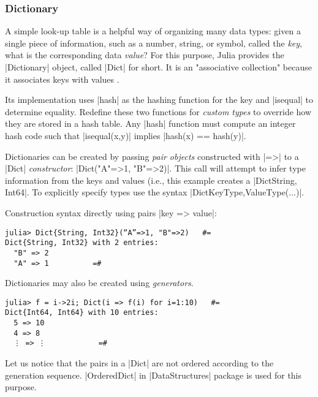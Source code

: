 \subsubsection*{Dictionary}

A simple look-up table is a helpful way of organizing many data types: given a single piece of information, such as a number, string, or symbol, called the \emph{key}, what is the corresponding data \emph{value}? For this purpose, Julia provides the |Dictionary| object, called |Dict| for short. It is an "associative collection" because it associates keys with values \cite{wiki:dict:sets}.

\begin{definition} 
Its implementation uses |hash| as the hashing function for the key and |isequal| to determine equality. Redefine these two functions for \emph{custom types} to override how they are stored in a hash table. Any |hash| function must compute an integer hash code such that |isequal(x,y)| implies |hash(x) == hash(y)|. 
\end{definition}

Dictionaries can be created by passing \emph{pair objects} constructed with |=>| to a |Dict| \emph{constructor}: |Dict("A"=>1, "B"=>2)|. This call will attempt to infer type information from the keys and values (i.e., this example creates a |Dict{String, Int64}|. To explicitly specify types use the syntax |Dict{KeyType,ValueType}(...)|.

\begin{coding} Construction syntax directly using pairs |key => value|:
\begin{lstlisting}[language=JuliaLocal, style=julia, mathescape=false]
julia> Dict{String, Int32}(“A”=>1, "B"=>2)   #=
Dict{String, Int32} with 2 entries:
  "B" => 2
  "A" => 1 			=#
\end{lstlisting}
\end{coding}

\begin{coding} 
Dictionaries may also be created using \emph{generators}.
\begin{lstlisting}[language=JuliaLocal, style=julia, mathescape=false]
julia> f = i->2i; Dict(i => f(i) for i=1:10)   #=
Dict{Int64, Int64} with 10 entries:
  5 => 10
  4 => 8
  ⋮ => ⋮   			=#
\end{lstlisting}
\end{coding}

\begin{remark}
Let us notice that the pairs in a |Dict| are not ordered according to the generation sequence. |OrderedDict| in |DataStructures| package is used for this purpose.
\end{remark}

